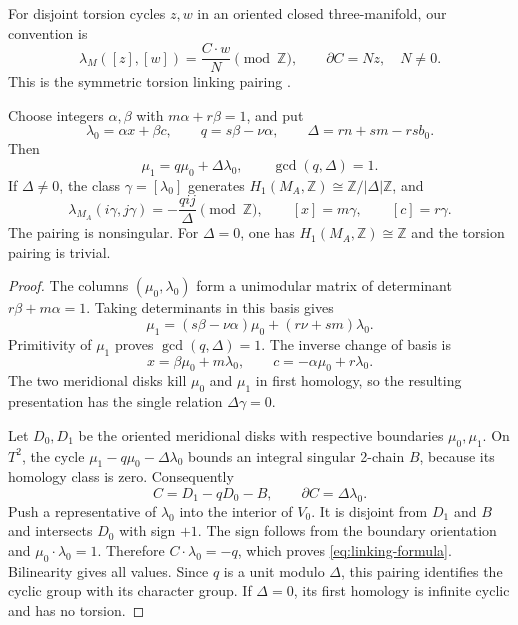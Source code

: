 \documentclass[11pt]{article}
\numberwithin{equation}{section}
\begin{document}
For disjoint torsion cycles $z,w$ in an oriented closed three-manifold,
our convention is
\[
 \lambda_M([z],[w])=\frac{C\cdot w}{N}\pmod{\mathbb Z},
             \qquad \partial C=Nz,\quad N\ne0.
\]
This is the symmetric torsion linking pairing
\cite[Section~1, pp.~2--3]{Hillman}.

\begin{theorem}\label{thm:linking}
Choose integers $\alpha,\beta$ with $m\alpha+r\beta=1$, and put
\begin{equation}\label{eq:linking-coordinates}
 \lambda_0=\alpha x+\beta c,\qquad
 q=s\beta-\nu\alpha,\qquad \Delta=rn+sm-rsb_0.
\end{equation}
Then
\[
       \mu_1=q\mu_0+\Delta\lambda_0,\qquad
       \gcd(q,\Delta)=1.
\]
If $\Delta\ne0$, the class $\gamma=[\lambda_0]$ generates
$H_1(M_A,\mathbb Z)\cong\mathbb Z/|\Delta|\mathbb Z$, and
\begin{equation}\label{eq:linking-formula}
 \lambda_{M_A}(i\gamma,j\gamma)=-\frac{qij}{\Delta}
            \pmod{\mathbb Z},\qquad
 [x]=m\gamma,\qquad[c]=r\gamma.
\end{equation}
The pairing is nonsingular.  For $\Delta=0$, one has
$H_1(M_A,\mathbb Z)\cong\mathbb Z$ and the torsion pairing is trivial.
\end{theorem}

\begin{proof}
The columns $(\mu_0,\lambda_0)$ form a unimodular matrix of determinant
$r\beta+m\alpha=1$.  Taking determinants in this basis gives
\[
 \mu_1=(s\beta-\nu\alpha)\mu_0+(r\nu+sm)\lambda_0.
\]
Primitivity of $\mu_1$ proves $\gcd(q,\Delta)=1$.
The inverse change of basis is
\[
               x=\beta\mu_0+m\lambda_0,\qquad
               c=-\alpha\mu_0+r\lambda_0.
\]
The two meridional disks kill $\mu_0$ and $\mu_1$ in first homology,
so the resulting presentation has the single relation $\Delta\gamma=0$.

Let $D_0,D_1$ be the oriented meridional disks with respective
boundaries $\mu_0,\mu_1$.  On $T^2$, the cycle
$\mu_1-q\mu_0-\Delta\lambda_0$ bounds an integral singular
2-chain $B$, because its homology class is zero.  Consequently
\[
                   C=D_1-qD_0-B,\qquad
                   \partial C=\Delta\lambda_0.
\]
Push a representative of $\lambda_0$ into the interior of $V_0$.
It is disjoint from $D_1$ and $B$ and intersects $D_0$ with sign $+1$.
The sign follows from the boundary orientation and
$\mu_0\cdot\lambda_0=1$.  Therefore $C\cdot\lambda_0=-q$,
which proves \eqref{eq:linking-formula}.  Bilinearity gives all values.
Since $q$ is a unit modulo $\Delta$, this pairing identifies the cyclic
group with its character group.  If $\Delta=0$, its first homology
is infinite cyclic and has no torsion.
\end{proof}
\end{document}
